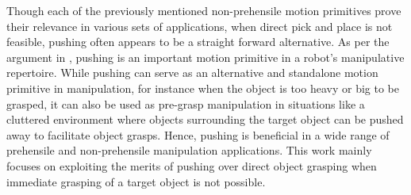 \documentclass[rnd]{mas_proposal}
\begin{document}
Though each of the previously mentioned non-prehensile motion primitives prove their relevance in various sets of applications, when direct pick and place is not feasible, pushing often appears to be  a straight forward alternative. As per the argument in \cite{stuber2019let}, pushing is an important motion primitive in a robot’s manipulative repertoire. While pushing can serve as an alternative and standalone motion primitive in manipulation, for instance when the object is too heavy or big to be grasped, it can also be used as pre-grasp manipulation in situations like a cluttered environment where objects surrounding the target object can be pushed away to facilitate object grasps. Hence, pushing is beneficial in a wide range of prehensile and non-prehensile manipulation applications. This work mainly focuses on exploiting the merits of pushing over direct object grasping when immediate grasping of a target object is not possible.
\end{document}
